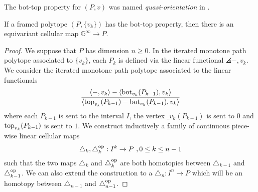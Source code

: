 The bot-top property for $(P,v)$ was named \emph{quasi-orientation} in \cite[Definition 1.11]{GLA21}.

\begin{theorem}
	\label{thm:map-from-the-globe}
	If a framed polytope $(P,\{v_k\})$ has the bot-top property, then there is an equivariant cellular map $\mathbb{G}^\infty \to P$.
\end{theorem}

\begin{proof}
	We suppose that $P$ has dimension $n\geq 0$.
	In the iterated monotone path polytope associated to $\{v_k\}$, each $P_k$ is defined via the linear functional $\angles{-,v_k}$.
	We consider the iterated monotone path polytope associated to the linear functionals
	\begin{equation} \label{eq:new-projection}
		\frac{\langle-,v_k\rangle-\langle\operatorname{bot}_{v_k}(P_{k-1}),v_k\rangle}{\langle\operatorname{top}_{v_k}(P_{k-1})-\operatorname{bot}_{v_k}(P_{k-1}),v_k\rangle}
	\end{equation}
	where each $P_{k-1}$ is sent to the interval $I$, the vertex $\bm_{v_k}(P_{k-1})$ is sent to $0$ and $\operatorname{top}_{v_k}(P_{k-1})$ is sent to $1$.
	We construct inductively a family of continuous piece-wise linear cellular maps
	\[
	\triangle_k, \triangle_k^{\mathrm{op}}: I^k \to P \ , 0 \leq k \leq n-1
	\]
	such that the two maps $\triangle_k$ and $\triangle_k^{\mathrm{op}}$ are both homotopies between $\triangle_{k-1}$ and $\triangle_{k-1}^{\mathrm{op}}$.
	We can also extend the construction to a $\triangle_n : I^n \to P$ which will be an homotopy between $\triangle_{n-1}$ and $\triangle_{n-1}^{\mathrm{op}}$.


\end{proof}
